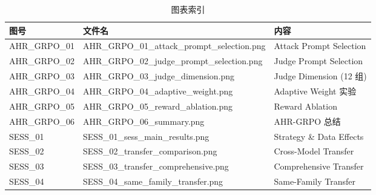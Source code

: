 \documentclass[12pt,a4paper]{article}
\begin{document}
\begin{table}[H]
    \centering
    \begin{tabular}{@{}l l l@{}}
        \toprule
        \rowcolor{tableheader}
        \textbf{图号} & \textbf{文件名} & \textbf{内容} \\
        \midrule
        AHR\_GRPO\_01 & AHR\_GRPO\_01\_attack\_prompt\_selection.png & Attack Prompt Selection \\
        AHR\_GRPO\_02 & AHR\_GRPO\_02\_judge\_prompt\_selection.png & Judge Prompt Selection \\
        AHR\_GRPO\_03 & AHR\_GRPO\_03\_judge\_dimension.png & Judge Dimension (12 组) \\
        AHR\_GRPO\_04 & AHR\_GRPO\_04\_adaptive\_weight.png & Adaptive Weight 实验 \\
        AHR\_GRPO\_05 & AHR\_GRPO\_05\_reward\_ablation.png & Reward Ablation \\
        AHR\_GRPO\_06 & AHR\_GRPO\_06\_summary.png & AHR-GRPO 总结 \\
        SESS\_01 & SESS\_01\_sess\_main\_results.png & Strategy \& Data Effects \\
        SESS\_02 & SESS\_02\_transfer\_comparison.png & Cross-Model Transfer \\
        SESS\_03 & SESS\_03\_transfer\_comprehensive.png & Comprehensive Transfer \\
        SESS\_04 & SESS\_04\_same\_family\_transfer.png & Same-Family Transfer \\
        \bottomrule
    \end{tabular}
    \caption{图表索引}
    \label{tab:figure_index}
\end{table}

\newpage


\end{document}
